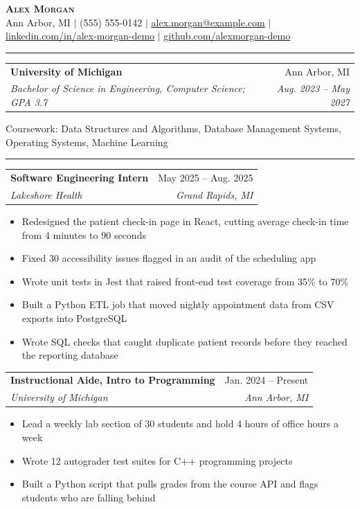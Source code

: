 \documentclass[letterpaper,11pt]{article}
\makeatletter
\renewcommand{\section}[1]{\vspace{5pt}{\large\scshape #1}\par\vspace{-3pt}\rule{\textwidth}{0.4pt}\par\vspace{2pt}}
\newcommand{\resumeItem}[1]{\item\small{#1}}
\newcommand{\resumeSubheading}[4]{
  \item
    \begin{tabular*}{0.97\textwidth}[t]{l@{\extracolsep{\fill}}r}
      \textbf{#1} & #2 \\
      \textit{\small#3} & \textit{\small #4} \\
    \end{tabular*}
}
\newcommand{\resumeSubHeadingListStart}{\begin{list}{}{\setlength{\leftmargin}{0.15in}\setlength{\itemsep}{1pt}\setlength{\topsep}{0pt}}}
\newcommand{\resumeSubHeadingListEnd}{\end{list}}
\newcommand{\resumeItemListStart}{\begin{itemize}\setlength{\itemsep}{-2pt}}
\newcommand{\resumeItemListEnd}{\end{itemize}}
\makeatother
\begin{document}
\begin{center}
    \textbf{\Huge \scshape Alex Morgan} \\ \vspace{2pt}
    \small Ann Arbor, MI $|$ (555) 555-0142 $|$ \href{mailto:alex.morgan@example.com}{\underline{alex.morgan@example.com}} $|$
    \href{https://linkedin.com/in/alex-morgan-demo}{\underline{linkedin.com/in/alex-morgan-demo}} $|$
    \href{https://github.com/alexmorgan-demo}{\underline{github.com/alexmorgan-demo}}
\end{center}
\section{Education}
  \resumeSubHeadingListStart
    \resumeSubheading
      {University of Michigan}{Ann Arbor, MI}
      {Bachelor of Science in Engineering, Computer Science; GPA 3.7}{Aug. 2023 -- May 2027}
    \item \small{Coursework: Data Structures and Algorithms, Database Management Systems, Operating Systems, Machine Learning}
  \resumeSubHeadingListEnd
\section{Experience}
  \resumeSubHeadingListStart
    \resumeSubheading
      {Software Engineering Intern}{May 2025 -- Aug. 2025}
      {Lakeshore Health}{Grand Rapids, MI}
      \resumeItemListStart
        \resumeItem{Redesigned the patient check-in page in React, cutting average check-in time from 4 minutes to 90 seconds}
        \resumeItem{Fixed 30 accessibility issues flagged in an audit of the scheduling app}
        \resumeItem{Wrote unit tests in Jest that raised front-end test coverage from 35\% to 70\%}
        \resumeItem{Built a Python ETL job that moved nightly appointment data from CSV exports into PostgreSQL}
        \resumeItem{Wrote SQL checks that caught duplicate patient records before they reached the reporting database}
      \resumeItemListEnd
    \resumeSubheading
      {Instructional Aide, Intro to Programming}{Jan. 2024 -- Present}
      {University of Michigan}{Ann Arbor, MI}
      \resumeItemListStart
        \resumeItem{Lead a weekly lab section of 30 students and hold 4 hours of office hours a week}
        \resumeItem{Wrote 12 autograder test suites for C++ programming projects}
        \resumeItem{Built a Python script that pulls grades from the course API and flags students who are falling behind}
      \resumeItemListEnd
  \resumeSubHeadingListEnd
\end{document}
